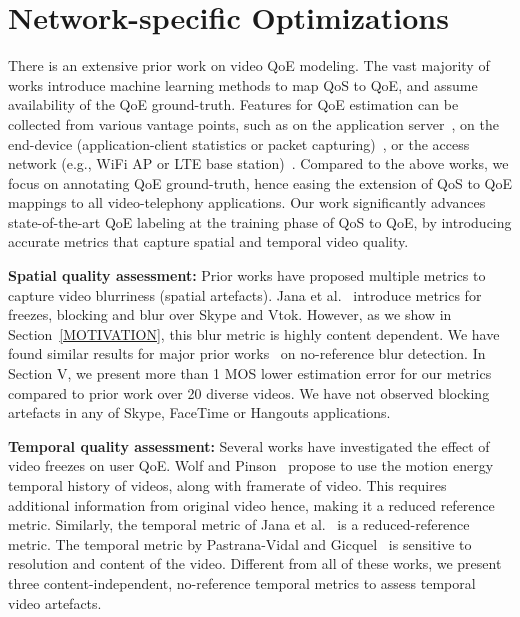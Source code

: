\section{Network-specific Optimizations}
There is an extensive prior work on video QoE modeling. The vast majority of works \cite{aggarwal2014prometheus,balachandran2013developing,fiedler2010generic} introduce machine learning methods to map QoS to QoE, and assume availability of the QoE ground-truth. Features for QoE estimation can be collected from various vantage points, such as on the application server~\cite{balachandran2013developing}, on the end-device (application-client statistics or packet capturing)~\cite{zhang2012profiling,yu2014can,seufert2015survey,aggarwal2014prometheus,balachandran2012quest,chen2014qoe}, or the access network (e.g., WiFi AP or LTE base station)~\cite{chakraborty2016exbox,jana2016qoe,chen2006quantifying}. Compared to the above works, we focus on annotating QoE ground-truth, hence easing the extension of QoS to QoE mappings to all video-telephony applications. Our work significantly advances state-of-the-art QoE labeling at the training phase of QoS to QoE, by introducing accurate metrics that capture spatial and temporal video quality.

\noindent
\textbf{Spatial quality assessment:}  Prior works have proposed multiple metrics to capture video blurriness (spatial artefacts). Jana et al.~\cite{jana2016qoe} introduce metrics for freezes, blocking and blur over Skype and Vtok. However, as we show in Section~\ref{MOTIVATION}, this blur metric is highly content dependent. We have found similar results for major prior works~\cite{golestaneh2014no, mittal2012no,tong2004blur,marziliano2002no} on no-reference blur detection. In Section V, we present more than 1 MOS lower estimation error for our metrics compared to prior work over 20 diverse videos. We have not observed blocking artefacts in any of Skype, FaceTime or Hangouts applications.

\noindent
\textbf{Temporal quality assessment:} Several works \cite{wolf2009no, borer2010model, usman2017no, pastrana2006automatic} have investigated the effect of video freezes on user QoE. Wolf and Pinson~\cite{wolf2009no} propose to use the motion energy temporal history of videos, along with framerate of video. This requires additional information from original video hence, making it a reduced reference metric. Similarly, the temporal metric of Jana et al.~\cite{jana2016qoe} is a reduced-reference metric. The temporal metric by Pastrana-Vidal and Gicquel~\cite{pastrana2006automatic} is sensitive to resolution and content of the video. Different from all of these works, we present three content-independent, no-reference temporal metrics to assess temporal video artefacts.

